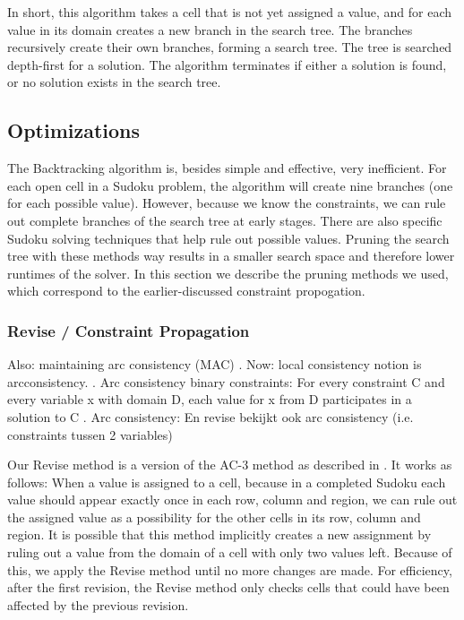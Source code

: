 \documentclass[11pt]{article} %
\begin{document}
In short, this algorithm takes a cell that is not yet assigned a value, and for each value in its domain creates a new branch in the search tree. The branches recursively create their own branches, forming a search tree. The tree is searched depth-first for a solution. The algorithm terminates if either a solution is found, or no solution exists in the search tree.

\subsection{Optimizations}

The Backtracking algorithm is, besides simple and effective, very inefficient. For each open cell in a Sudoku problem, the algorithm will create nine branches (one for each possible value). However, because we know the constraints, we can rule out complete branches of the search tree at early stages. There are also specific Sudoku solving techniques that help rule out possible values. Pruning the search tree with these methods way results in a smaller search space and therefore lower runtimes of the solver. In this section we describe the pruning methods we used, which correspond to the earlier-discussed constraint propogation.

\subsubsection{Revise / Constraint Propagation}

Also:
maintaining arc consistency (MAC)
. Now: local consistency notion is arcconsistency.
. Arc consistency binary constraints:
For every constraint C and every variable x with domain D, each
value for x from D participates in a solution to C
. Arc consistency:
En revise bekijkt ook arc consistency (i.e. constraints tussen 2 variables)


Our Revise method is a version of the AC-3 method as described in \citet{BartakConsistency}. It works as follows: When a value is assigned to a cell, because in a completed Sudoku each value should appear exactly once in each row, column and region, we can rule out the assigned value as a possibility for the other cells in its row, column and region. It is possible that this method implicitly creates a new assignment by ruling out a value from the domain of a cell with only two values left. Because of this, we apply the Revise method until no more changes are made. For efficiency, after the first revision, the Revise method only checks cells that could have been affected by the previous revision.
\end{document}
